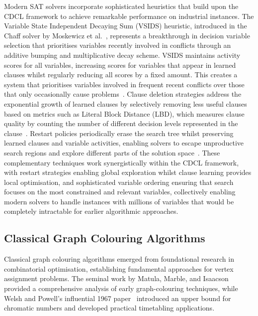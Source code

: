 Modern SAT solvers incorporate sophisticated heuristics that build upon the CDCL framework to achieve remarkable performance on industrial instances. The Variable State Independent Decaying Sum (VSIDS) heuristic, introduced in the Chaff solver by Moskewicz et al.~\cite{moskewicz2001chaff}, represents a breakthrough in decision variable selection that prioritises variables recently involved in conflicts through an additive bumping and multiplicative decay scheme. VSIDS maintains activity scores for all variables, increasing scores for variables that appear in learned clauses whilst regularly reducing all scores by a fixed amount. This creates a system that prioritises variables involved in frequent recent conflicts over those that only occasionally cause problems~\cite{liang2015understanding}. Clause deletion strategies address the exponential growth of learned clauses by selectively removing less useful clauses based on metrics such as Literal Block Distance (LBD), which measures clause quality by counting the number of different decision levels represented in the clause~\cite{audemard2017learned}. Restart policies periodically erase the search tree whilst preserving learned clauses and variable activities, enabling solvers to escape unproductive search regions and explore different parts of the solution space~\cite{liang2018machine}. These complementary techniques work synergistically within the CDCL framework, with restart strategies enabling global exploration whilst clause learning provides local optimisation, and sophisticated variable ordering ensuring that search focuses on the most constrained and relevant variables, collectively enabling modern solvers to handle instances with millions of variables that would be completely intractable for earlier algorithmic approaches.

\subsection{Classical Graph Colouring Algorithms}
Classical graph colouring algorithms emerged from foundational research in combinatorial optimisation, establishing fundamental approaches for vertex assignment problems. The seminal work by Matula, Marble, and Isaacson~\cite{matula1972graph} provided a comprehensive analysis of early graph-colouring techniques, while Welsh and Powell's influential 1967 paper~\cite{welsh1967upper} introduced an upper bound for chromatic numbers and developed practical timetabling applications.

